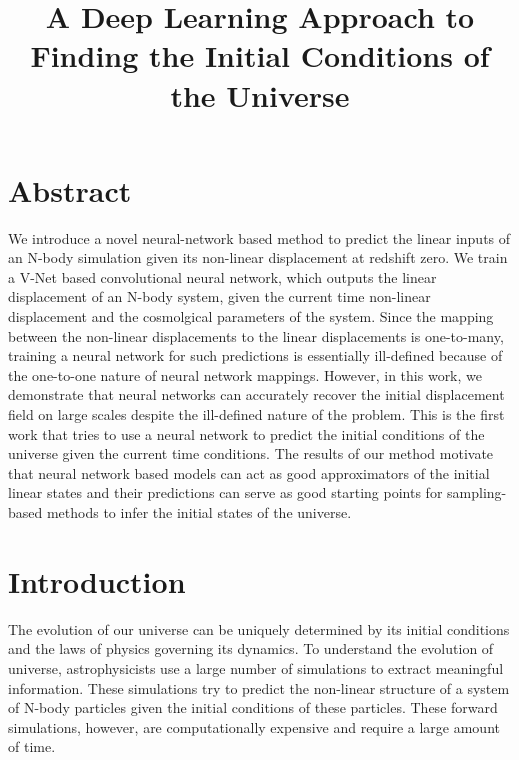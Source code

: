 \documentclass[11pt]{article}
\title{A Deep Learning Approach to Finding the Initial Conditions of the Universe}
\makeatletter
\let\inserttitle\@title
\makeatother
\begin{document}
\begin{center}
  \LARGE{\inserttitle}

\end{center}

\section{Abstract}

We introduce a novel neural-network based method to predict the linear inputs of an N-body simulation given its non-linear displacement at redshift zero. 
We train a V-Net based convolutional neural network, which outputs the linear displacement of an N-body system, given the current time non-linear displacement and the cosmolgical parameters of the system.
Since the mapping between the non-linear displacements to the linear displacements is one-to-many, training a neural network for such predictions is essentially ill-defined because of the one-to-one nature of neural network mappings. 
However, in this work, we demonstrate that neural networks can accurately recover the initial displacement field on large scales despite the ill-defined nature of the problem.
This is the first work that tries to use a neural network to predict the initial conditions of the universe given the current time conditions.
The results of our method motivate that neural network based models can act as good approximators of the initial linear states and their predictions can serve as good starting points for sampling-based methods to infer the initial states of the universe.

\section{Introduction}

The evolution of our universe can be uniquely determined by its initial conditions and the laws of physics governing its dynamics. To understand the evolution of  universe, astrophysicists use a large number of simulations to extract meaningful information. These simulations try to predict the non-linear structure of a system of N-body particles given the initial conditions of these particles. These forward simulations, however, are computationally expensive and require a large amount of time.
\end{document}
